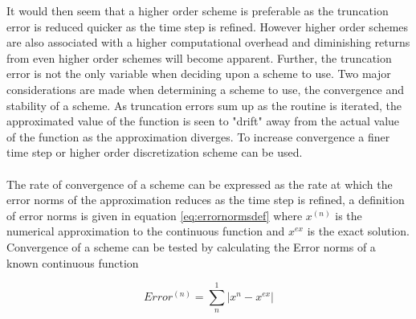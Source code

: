 It would then seem that a higher order scheme is preferable as the truncation error is reduced quicker as the time step is refined. However higher order schemes are also associated with a higher computational overhead and diminishing returns from even higher order schemes will become apparent. Further, the truncation error is not the only variable when deciding upon a scheme to use. Two major considerations are made when determining a scheme to use, the convergence and stability of a scheme. As truncation errors sum up as the routine is iterated, the approximated value of the function is seen to "drift" away from the actual value of the function as the approximation diverges. To increase convergence a finer time step or higher order discretization scheme can be used.
\\\\
The rate of convergence of a scheme can be expressed as the rate at which the error norms of the approximation reduces as the time step is refined, a definition of error norms is given in equation \ref{eq:errornormsdef} where $x^{(n)}$ is the numerical approximation to the continuous function and $x^{ex}$ is the exact solution. Convergence of a scheme can be tested by calculating the Error norms of a known continuous function 

\begin{equation}
\label{eq:errornormsdef}
Error^{(n)}=\sum_{n}^{1} |x^{n}-x^{ex}|
\end{equation}


